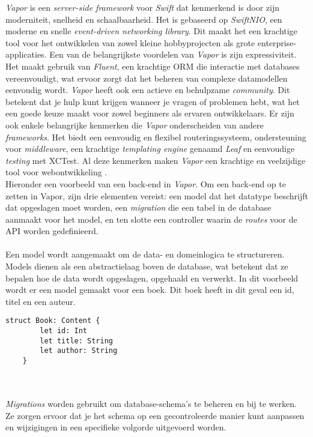 \textit{Vapor} is een \textit{server-side framework} voor \textit{Swift} dat kenmerkend is door zijn \\moderniteit, snelheid en schaalbaarheid. Het is gebaseerd op \textit{SwiftNIO}, een \\moderne en snelle \textit{event-driven networking library}. Dit maakt het een krachtige tool voor het ontwikkelen van zowel kleine hobbyprojecten als grote enterprise-applicaties. Een van de belangrijkste voordelen van \textit{Vapor} is zijn expressiviteit. Het maakt gebruik van \textit{Fluent}, een krachtige ORM die interactie met databases \\vereenvoudigt, wat ervoor zorgt dat het beheren van complexe datamodellen \\eenvoudig wordt. \textit{Vapor} heeft ook een actieve en behulpzame \textit{community}. Dit \\betekent dat je hulp kunt krijgen wanneer je vragen of problemen hebt, wat het een goede keuze maakt voor zowel beginners als ervaren ontwikkelaars. Er zijn ook enkele belangrijke kenmerken die \textit{Vapor} onderscheiden van andere \textit{frameworks}. Het biedt een eenvoudig en flexibel routeringssysteem, ondersteuning voor \textit{middleware}, een krachtige \textit{templating engine} genaamd \textit{Leaf} en eenvoudige \textit{testing} met XCTest. Al deze kenmerken maken \textit{Vapor} een krachtige en veelzijdige tool voor webontwikkeling \autocite{Pant2023}.  \\
Hieronder een voorbeeld van een back-end in \textit{Vapor}. Om een back-end op te zetten in Vapor, zijn drie elementen vereist: een model dat het datatype beschrijft dat opgeslagen moet worden, een \textit{migration} die een tabel in de database aanmaakt voor het model, en ten slotte een controller waarin de \textit{routes} voor de API worden gedefinieerd. 
 \\  \\
Een model wordt aangemaakt om de data- en domeinlogica te structureren. Models dienen als een abstractielaag boven de database, wat betekent dat ze bepalen hoe de data wordt opgeslagen, opgehaald en verwerkt. In dit voorbeeld wordt er een model gemaakt voor een boek. Dit boek heeft in dit geval een id, titel en een auteur. 

\begin{lstlisting}[caption=Vapor example - Model]
     struct Book: Content {
        let id: Int
        let title: String
        let author: String
    }
\end{lstlisting}
 \\  \\
 \textit{Migrations} worden gebruikt om database-schema's te beheren en bij te werken. Ze zorgen ervoor dat je het schema op een gecontroleerde manier kunt aanpassen en wijzigingen in een specifieke volgorde uitgevoerd worden. 

